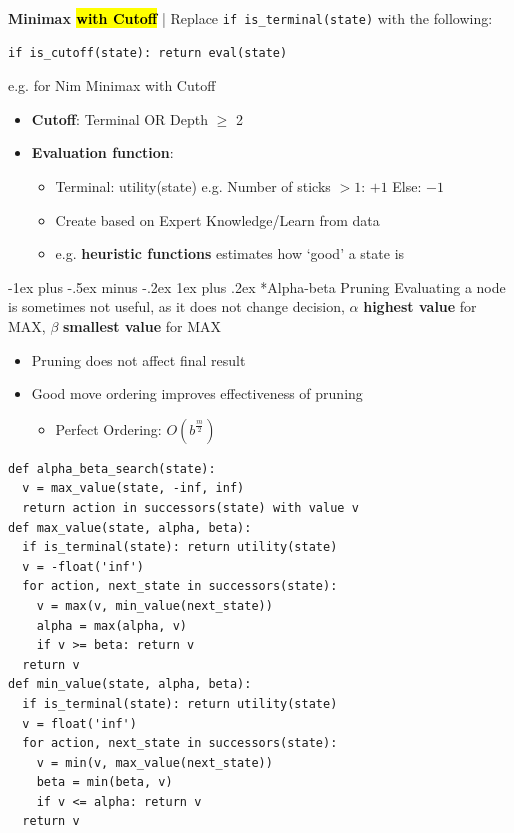 \documentclass[10pt,landscape]{article}
\makeatletter
\renewcommand{\subsubsection}{\@startsection{subsubsection}{3}{0mm}%
                                {-1ex plus -.5ex minus -.2ex}%
                                {1ex plus .2ex}%
                                {\normalfont\small\bfseries}}
\makeatother
\begin{document}
\begin{multicols*}{3}
\textbf{Minimax \hl{with Cutoff}} | Replace \verb|if is_terminal(state)| with the following:
\begin{lstlisting}[basicstyle = \scriptsize\ttfamily]
  if is_cutoff(state): return eval(state)
\end{lstlisting}

e.g. for Nim Minimax with Cutoff
\begin{itemize}[topsep=0pt,noitemsep,wide=0pt, leftmargin=\dimexpr{} + 2\relax]
  \item \textbf{Cutoff}: Terminal OR Depth $\geq$ 2
  \item \textbf{Evaluation function}:
  \begin{itemize}[topsep=0pt,noitemsep,wide=0pt, leftmargin=\dimexpr{} + 2\relax]
    \item Terminal: utility(state) e.g. Number of sticks $> 1 $: $+1$ Else: $-1$
    \item Create based on Expert Knowledge/Learn from data
    \item e.g. \textbf{heuristic functions} estimates how `good' a state is
  \end{itemize}
\end{itemize}

\subsubsection*{Alpha-beta Pruning}
Evaluating a node is sometimes not useful, as it does not change decision, $\alpha$ \textbf{highest value} for MAX, $\beta$ \textbf{smallest value} for MAX
\begin{itemize}[topsep=0pt,noitemsep,wide=0pt, leftmargin=\dimexpr{} + 2\relax]
  \item Pruning does not affect final result
  \item Good move ordering improves effectiveness of pruning
  \begin{itemize}[topsep=0pt,noitemsep,wide=0pt, leftmargin=\dimexpr{} + 2\relax]
    \item Perfect Ordering: $O(b^{\frac{m}{2}})$
  \end{itemize}
\end{itemize}
\begin{lstlisting}[basicstyle = \scriptsize\ttfamily]
def alpha_beta_search(state):
  v = max_value(state, -inf, inf)
  return action in successors(state) with value v
def max_value(state, alpha, beta):
  if is_terminal(state): return utility(state)
  v = -float('inf')
  for action, next_state in successors(state):
    v = max(v, min_value(next_state))
    alpha = max(alpha, v)
    if v >= beta: return v
  return v
def min_value(state, alpha, beta):
  if is_terminal(state): return utility(state)
  v = float('inf')
  for action, next_state in successors(state):
    v = min(v, max_value(next_state))
    beta = min(beta, v)
    if v <= alpha: return v
  return v
\end{lstlisting}


\end{multicols*}
\end{document}

